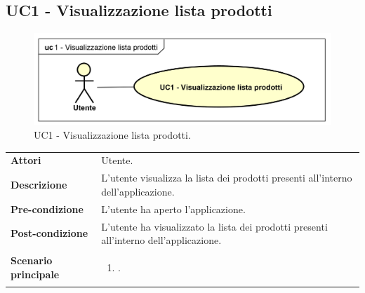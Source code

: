 {\subsection*{UC1 - Visualizzazione lista prodotti}
	\label{sec:UC1}  
	\begin{figure}[H] 
		\centering 
		\includegraphics[scale=0.35]{"immagini/usecase/UC1 - Visualizzazione lista prodotti"} 
		\caption{UC1 - Visualizzazione lista prodotti.}
	\end{figure}
	\def\arraystretch{1.3}
	\begin{tabularx}{\textwidth}{l|p{}}
		\rowcolor{I} \multicolumn{2}{c}{\color{white}\textbf{UC1 - Visualizzazione lista prodotti}} \\
		\toprule
		\endhead
		\textbf{Attori} & Utente.\\
		\textbf{Descrizione} & L'utente visualizza la lista dei prodotti presenti all'interno dell'applicazione.\\
		\textbf{Pre-condizione} & L'utente ha aperto l'applicazione.\\
		\textbf{Post-condizione} & L'utente ha visualizzato la lista dei prodotti presenti all'interno dell'applicazione.\\
		\textbf{Scenario principale} & \vspace{-1.2em}
		\begin{enumerate}[leftmargin=*,noitemsep,nosep]
			\item \nameref{sec:UC1}.
		\end{enumerate}\\
	\end{tabularx}

}
